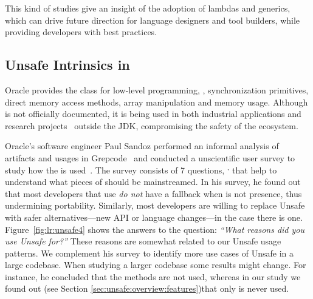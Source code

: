 This kind of studies give an insight of the adoption of lambdas and generics, which can drive future direction for language designers and tool builders, while providing developers with best practices.

\subsection{Unsafe Intrinsics in \java{}}
\label{sec:literature-review:unsafe}

Oracle provides the \smu{} class for low-level programming,
\eg{}, synchronization primitives, direct memory access methods,
array manipulation and memory usage.
Although \smu{} is not officially documented,
it is being used in both industrial applications
and research projects~\citep{korlandNoninvasiveConcurrencyJava2010,pukallFlexibleDynamicSoftware,gligoricCoDeSeFastDeserialization2011}
outside the JDK, compromising the safety of the \java{} ecosystem.

Oracle's software engineer Paul Sandoz performed an informal analysis of
\mavencentral{} artifacts and usages in Grepcode~\citep{sandoz-personal-communication}
and conducted a unscientific user survey to study how the \unsafe{} \api{} is used~\citep{psandoz14}.
The survey consists of 7 questions,%
%
\(^{,}\)%
that help to understand what pieces of \smu{} should be mainstreamed.
In his survey,
he found out that most developers that use \smu{} \emph{do not} have a fallback when \smu{} is not presence,
thus undermining portability.
Similarly, most developers are willing to replace Unsafe with safer alternatives---new API or language changes---in the case there is one.
Figure~\ref{fig:lr:unsafe4} shows the answers to the question:
\emph{``What reasons did you use Unsafe for?''}
These reasons are somewhat related to our Unsafe usage patterns.
We complement his survey to identify more use cases of Unsafe in a large codebase.
When studying a larger codebase some results might change.
For instance, he concluded that the  methods are not used,
whereas in our study we found out (see Section \ref{sec:unsafe:overview:features})that only  is never used.

